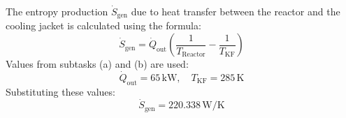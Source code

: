 The entropy production \( \dot{S}_{\text{gen}} \) due to heat transfer between the reactor and the cooling jacket is calculated using the formula:  
\[
\dot{S}_{\text{gen}} = \dot{Q}_{\text{out}} \left( \frac{1}{T_{\text{Reactor}}} - \frac{1}{T_{\text{KF}}} \right)
\]  
Values from subtasks (a) and (b) are used:  
\[
\dot{Q}_{\text{out}} = 65 \, \text{kW}, \quad T_{\text{KF}} = 285 \, \text{K}
\]  
Substituting these values:  
\[
\dot{S}_{\text{gen}} = 220.338 \, \text{W/K}
\]